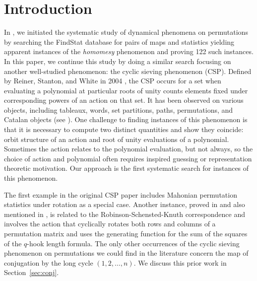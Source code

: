 \documentclass{amsart}
\theoremstyle{definition}
\begin{document}
\section{Introduction}
In \cite{ELMSW22}, we initiated the systematic study of dynamical phenomena on permutations by searching the FindStat database \cite{findstat} for pairs of maps and statistics yielding apparent instances of the \emph{homomesy} phenomenon and proving 122 such instances. In this paper, we continue this study by doing a similar search focusing on another well-studied phenomenon: the cyclic sieving phenomenon (CSP).
Defined by Reiner, Stanton, and White in 2004 \cite{ReStWh2004}, the CSP occurs for a set when evaluating a polynomial at particular roots of unity counts elements fixed under corresponding powers of an action on that set. It has been observed on various objects, including tableaux, words, set partitions, paths, permutations, and Catalan objects (see  \cite{CSPwebsite,WhatIsCSP,SaganCSP}).
One challenge to finding instances of this phenomenon is that it is necessary to compute two distinct quantities and show they coincide: orbit structure of an action and root of unity evaluations of a polynomial. Sometimes the action relates to the polynomial evaluation, but not always, so the choice of action and polynomial often requires inspired guessing or representation theoretic motivation. Our approach is the first systematic search for instances of this phenomenon.

The first example in the original CSP paper
\cite[Theorem 1.1]{ReStWh2004} includes Mahonian permutation statistics under rotation as a special case.
Another instance, proved in \cite{BRS} and also mentioned in \cite{CSPwebsite}, is related to the Robinson-Schensted-Knuth correspondence and involves the action that cyclically rotates both rows and columns of a permutation matrix and uses the generating function for the sum of the squares of the $q$-hook length formula.
The only other occurrences of the cyclic sieving phenomenon on permutations we could find in the literature concern the map of conjugation by the long cycle $(1, 2, \ldots, n)$.
We discuss this prior work in Section~\ref{sec:conj}.
\end{document}
